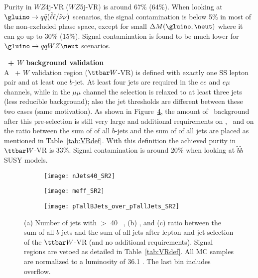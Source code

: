 Purity in $WZ$4j-VR ($WZ$5j-VR) is around 67$\%$ (64\%). When looking at $\gluino \rightarrow q \bar q (\tilde \ell \ell / \tilde \nu \nu)$ scenarios, the signal contamination is below 5\% in most of the non-excluded phase space, except for small $\Delta M(\gluino,\neut)$ where it can go up to 30\% (15\%). Signal contamination is found to be much lower for $\gluino \rightarrow q \bar q WZ \neut$ scenarios.



\par{\bf \ttbar\ + $W$ background validation\\}
A \ttbar\ + $W$ validation region ($\ttbar W$-VR) is defined with exactly one SS lepton pair and at least one $b$-jet. At least four jets are required in the $ee$ and $e\mu$ channels, while in the $\mu\mu$ channel the selection is relaxed to at least three jets  (less reducible background); also the jet \pt thresholds are different between these two cases (same motivation). As shown in Figure~\ref{fig:ttW_VR_afterLepJetSel}, the amount of \ttbar\ background after this pre-selection is still very large and additional requirements on \met, \meff\ and on the ratio between the sum of \pt of all $b$-jets and the sum of \pt of all jets are placed as mentioned in Table~\ref{tab:VRdef}. With this definition the achieved purity in $\ttbar W$-VR is 33\%. 
Signal contamination is around 20\% when looking at $\tilde b\tilde b$ SUSY 
models.

\begin{figure}[htb!]
\centering
\begin{subfigure}[t]{0.49\textwidth}
\texttt{[image: nJets40\_SR2]}
\subcaption{}\label{fig:ttwa}\end{subfigure}
\begin{subfigure}[t]{0.49\textwidth}
\texttt{[image: meff\_SR2]}
\subcaption{}\label{fig:ttwb}\end{subfigure}
\begin{subfigure}[t]{0.49\textwidth}
\texttt{[image: pTallBJets\_over\_pTallJets\_SR2]}
\subcaption{}\label{fig:ttwc}\end{subfigure}
\caption{(a) Number of jets with \pt $>$ 40 \GeV~, (b) \meff, and (c) ratio between the sum of all $b$-jets \pt and the sum of all jets \pt after lepton and jet selection of the $\ttbar W$-VR (and no additional requirements). Signal regions are vetoed as detailed in Table~\ref{tab:VRdef}. All MC samples are normalized to a luminosity of 36.1 \ifb. The last bin includes overflow.
}
\label{fig:ttW_VR_afterLepJetSel}
\end{figure} 

